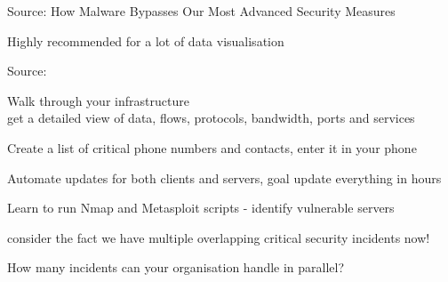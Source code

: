 \documentclass[20pt,landscape,a4paper]{foils}
\begin{document}
Source: How Malware Bypasses Our Most Advanced Security Measures\\
{\tiny{}}




\centerline{Highly recommended for a lot of data visualisation}

Source:


\begin{list2}
\item Walk through your infrastructure\\
get a detailed view of data, flows, protocols, bandwidth, ports and services

\item Create a list of critical phone numbers and contacts, enter it in your phone
\item Automate updates for both clients and servers, goal update everything in hours
\item Learn to run Nmap and Metasploit scripts - identify vulnerable servers
\end{list2}

\vskip 2cm
\centerline{consider the fact we have multiple overlapping critical security incidents now!}

\vskip 2cm
How many incidents can your organisation handle in parallel?


\myquestionspage
\end{document}
